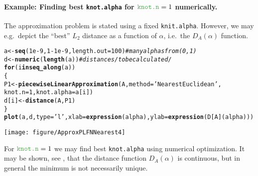 \documentclass[11pt]{article}\usepackage[]{graphicx}\usepackage[]{color}
\makeatletter
\newcommand{\hlnum}[1]{\textcolor[rgb]{0.686,0.059,0.569}{#1}}%
\newcommand{\hlstr}[1]{\textcolor[rgb]{0.192,0.494,0.8}{#1}}%
\newcommand{\hlcom}[1]{\textcolor[rgb]{0.678,0.584,0.686}{\textit{#1}}}%
\newcommand{\hlopt}[1]{\textcolor[rgb]{0,0,0}{#1}}%
\newcommand{\hlstd}[1]{\textcolor[rgb]{0.345,0.345,0.345}{#1}}%
\newcommand{\hlkwa}[1]{\textcolor[rgb]{0.161,0.373,0.58}{\textbf{#1}}}%
\newcommand{\hlkwb}[1]{\textcolor[rgb]{0.69,0.353,0.396}{#1}}%
\newcommand{\hlkwc}[1]{\textcolor[rgb]{0.333,0.667,0.333}{#1}}%
\newcommand{\hlkwd}[1]{\textcolor[rgb]{0.737,0.353,0.396}{\textbf{#1}}}%
\newenvironment{kframe}{%
 \def\at@end@of@kframe{}%
 \ifinner\ifhmode%
  \def\at@end@of@kframe{\end{minipage}}%
  \begin{minipage}{\columnwidth}%
 \fi\fi%
 \def\FrameCommand##1{\hskip\@totalleftmargin \hskip-\fboxsep
 \colorbox{shadecolor}{##1}\hskip-\fboxsep
     \hskip-\linewidth \hskip-\@totalleftmargin \hskip\columnwidth}%
 \MakeFramed {\advance\hsize-\width
   \@totalleftmargin\z@ \linewidth\hsize
   \@setminipage}}%
 {\par\unskip\endMakeFramed%
 \at@end@of@kframe}
\newenvironment{knitrout}{}{} %
\newcommand{\argument}[1]{\texttt{\hlkwc{#1}}}
\makeatother
\begin{document}
\paragraph{Example: Finding best \argument{knot.alpha}
for $\text{\argument{knot.n}}=1$ numerically.}
The approximation problem is stated using a fixed
\argument{knit.alpha}.
However, we may e.g.~depict the ``best'' $L_2$ distance as a function of $\alpha$,
i.e.~the $D_{A}(\alpha)$ function.

\begin{knitrout}\small
{}\color{fgcolor}\begin{kframe}
\begin{alltt}
\hlstd{a} \hlkwb{<-} \hlkwd{seq}\hlstd{(}\hlnum{1e-9}\hlstd{,} \hlnum{1}\hlopt{-}\hlnum{1e-9}\hlstd{,} \hlkwc{length.out}\hlstd{=}\hlnum{100}\hlstd{)} \hlcom{# many alphas from (0,1)}
\hlstd{d} \hlkwb{<-} \hlkwd{numeric}\hlstd{(}\hlkwd{length}\hlstd{(a))} \hlcom{# distances /to be calculated/}
\hlkwa{for} \hlstd{(i} \hlkwa{in} \hlkwd{seq_along}\hlstd{(a))}
\hlstd{\{}
   \hlstd{P1} \hlkwb{<-} \hlkwd{piecewiseLinearApproximation}\hlstd{(A,} \hlkwc{method}\hlstd{=}\hlstr{'NearestEuclidean'}\hlstd{,}
            \hlkwc{knot.n}\hlstd{=}\hlnum{1}\hlstd{,} \hlkwc{knot.alpha}\hlstd{=a[i])}
   \hlstd{d[i]} \hlkwb{<-} \hlkwd{distance}\hlstd{(A, P1)}
\hlstd{\}}
\hlkwd{plot}\hlstd{(a, d,} \hlkwc{type}\hlstd{=}\hlstr{'l'}\hlstd{,} \hlkwc{xlab}\hlstd{=}\hlkwd{expression}\hlstd{(alpha),} \hlkwc{ylab}\hlstd{=}\hlkwd{expression}\hlstd{(D[A](alpha)))}
\end{alltt}
\end{kframe}
\end{knitrout}

\begin{center}
\begin{knitrout}\small
{}\color{fgcolor}

{\centering \texttt{[image: figure/ApproxPLFNNearest4]} 

}



\end{knitrout}
\end{center}

For $\text{\argument{knot.n}}=1$ we may find best \argument{knot.alpha} using numerical optimization.
It may be shown, see \cite{CoroianuETAL2013:piecewise1},
that the distance function $D_{A}(\alpha)$ is continuous,
but in general the minimum is not necessarily unique.
\end{document}
